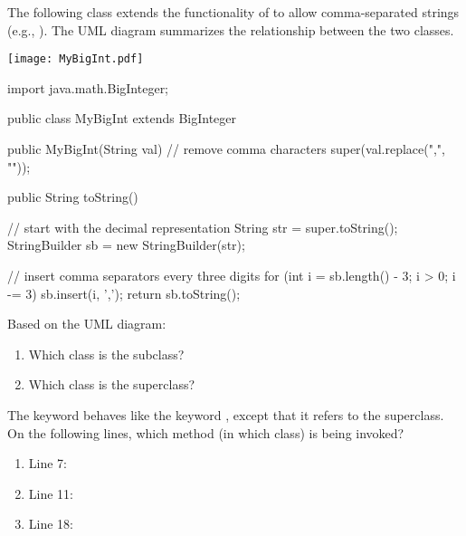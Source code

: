 
The following class extends the functionality of  to allow comma-separated strings (e.g., ).
The UML diagram summarizes the relationship between the two classes.

\vspace{1em}
\hfill \texttt{[image: MyBigInt.pdf]} \hspace{2em}
\vspace{-8em}

\begin{javanum}
import java.math.BigInteger;

public class MyBigInt extends BigInteger {

    public MyBigInt(String val) {
        // remove comma characters
        super(val.replace(",",  ""));
    }

    public String toString() {
        // start with the decimal representation
        String str = super.toString();
        StringBuilder sb = new StringBuilder(str);

        // insert comma separators every three digits
        for (int i = sb.length() - 3; i > 0; i -= 3) {
            sb.insert(i, ',');
        }
        return sb.toString();
    }

}
\end{javanum}




\Q Based on the UML diagram:

\setlength{\defaultwidth}{8em}

\begin{enumerate}
\item Which class is the subclass?   
\item Which class is the superclass? 
\end{enumerate}


\Q The keyword  behaves like the keyword , except that it refers to the superclass.
On the following lines, which method (in which class) is being invoked?

\setlength{\defaultwidth}{15em}

\begin{enumerate}
\item Line 7:  
\item Line 11: 
\item Line 18: 
\end{enumerate}


